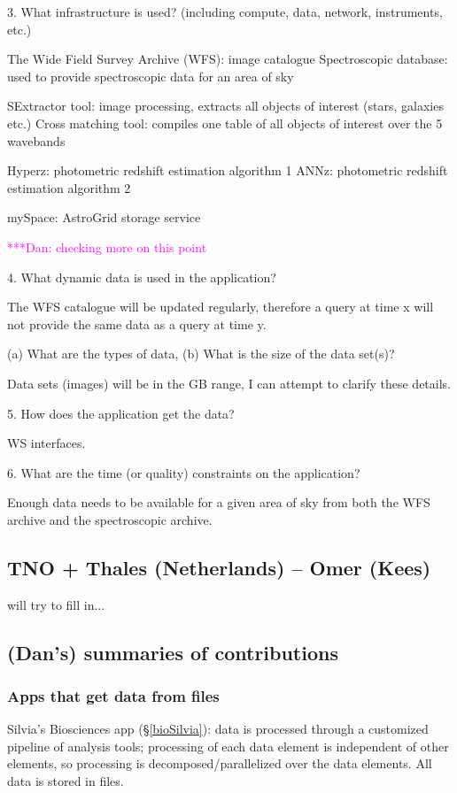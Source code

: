 \documentclass[preprint,12pt]{article}
\newcommand{\katznote}[1]{ {\textcolor{magenta}    { ***Dan:      #1 }}}
\newcommand{\katznote}[1]{}
\begin{document}
3. What infrastructure is used? (including compute, data, network, instruments, etc.)

The Wide Field Survey Archive (WFS):  image catalogue
Spectroscopic database: used to provide spectroscopic data for an area of sky

SExtractor tool: image processing, extracts all objects of interest (stars, galaxies etc.)
Cross matching tool: compiles one table of all objects of interest over the 5 wavebands

Hyperz: photometric redshift estimation algorithm 1
ANNz: photometric redshift estimation algorithm 2

mySpace: AstroGrid storage service

\katznote{checking more on this point}

4. What dynamic data is used in the application?

The WFS catalogue will be updated regularly, therefore a query at time x will not provide the same data as a query at time y.

(a) What are the types of data, (b) What is the size of the data set(s)?

Data sets (images) will be in the GB range, I can attempt to clarify these details.

5. How does the application get the data?

WS interfaces.

6. What are the time (or quality) constraints on the application?

Enough data needs to be available for a given area of sky from both the WFS archive and the spectroscopic archive.


\subsection{TNO + Thales (Netherlands)  -- Omer (Kees)}

will try to fill in...


\subsection{(Dan's) summaries of contributions}

\subsubsection{Apps that get data from files}

Silvia's Biosciences app (\S\ref{bioSilvia}): data is processed through a customized pipeline of analysis tools; processing of each data element is independent of other elements, so processing is decomposed/parallelized over the data elements.  All data is stored in files.
\end{document}
